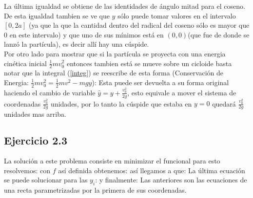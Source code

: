 La \'ultima igualdad se obtiene de las identidades de \'angulo mitad para el coseno.
De esta igualdad tambien se ve que $y$ s\'olo puede tomar valores en el intervalo $[0,2a]$ (ya que la que la cantidad dentro del radical del coseno s\'olo es mayor que 0 en este intervalo) y que uno de sus m\'inimos est\'a en $(0,0)$(que fue de donde se lanz\'o la part\'icula), es decir all\'i hay una c\'uspide.\\
Por otro lado para mostrar que si la part\'icula se proyecta con una energia cin\'etica inicial $\frac{1}{2}m v_0^2$ entonces tambien est\'a se mueve sobre un cicloide basta notar que la integral (\ref{integ}) se reescribe de esta forma (Conservaci\'on de Energia: $\frac{1}{2}m v_0^2=\frac{1}{2} mv^2-mgy$):
Esta puede ser devuelta a su forma original haciendo el cambio de variable $\hat y=y+\frac{v_0^2}{2g}$, esto equivale a mover el sistema de coordenadas $\frac{v_0^2}{2g}$ unidades, por lo tanto la c\'uspide que estaba en $y=0$ quedar\'a $\frac{v_0^2}{2g}$ unidades mas arriba.


\subsection*{Ejercicio 2.3 }
La soluci\'on a este problema consiste en minimizar el funcional 
 para esto resolvemos:
con $f$ as\'i definida obtenemos:
as\'i llegamos a que:
La \'ultima ecuaci\'on se puede solucionar para las $y_i$:
y finalmente:
Las anteriores son las ecuaciones de una recta parametrizadas por la primera de sus coordenadas.

